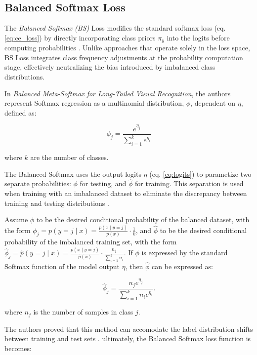 \subsection{Balanced Softmax Loss}
\label{sec:bs_loss}
The \emph{Balanced Softmax (BS)} Loss modifies the standard softmax loss (eq. \eqref{eq:ce_loss}) by directly incorporating class priors $\pi_y$ into the logits before computing probabilities \cite{ren2020balancedmetasoftmaxlongtailedvisual}. Unlike approaches that operate solely in the loss space, BS Loss integrates class frequency adjustments at the probability computation stage, effectively neutralizing the bias introduced by imbalanced class distributions. 

In \emph{Balanced Meta-Softmax for Long-Tailed Visual Recognition}, the authors represent Softmax regression as a multinomial distribution, $\phi$, dependent on $\eta$, defined as:

\begin{equation}
    \phi_j = \frac{e^{\eta_j}}{\sum_{i=1}^{k}e^{\eta_i}}
\end{equation}

where $k$ are the number of classes.

The Balanced Softmax uses the output logits $\eta$ (eq. \eqref{eq:logits}) to parametize two separate probabilities: $\phi$ for testing, and $\hat{\phi}$ for training. This separation is used when training with an imbalanced dataset to eliminate the discrepancy between training and testing distributions \cite{ren2020balancedmetasoftmaxlongtailedvisual}.

Assume $\phi$ to be the desired conditional probability of the balanced dataset, with the form $\phi_j = p(y = j \mid x) = \frac{p(x \mid y=j)}{p(x)} \cdot \frac{1}{k}$, and $\hat{\phi}$ to be the desired conditional probability of the imbalanced training set, with the form $\hat{\phi}_j = \hat{p}(y = j \mid x) = \frac{p(x \mid y=j)}{\hat{p}(x)} \cdot \frac{n_j}{\sum_{i=1}^{k} n_i}$. If $\phi$ is expressed by the standard Softmax function of the model output $\eta$, then $\hat{\phi}$ can be expressed as:

\begin{equation}
    \hat{\phi}_j = \frac{n_j e^{\eta_j}}{\sum_{i=1}^{k} n_i e^{\eta_i}}.
\end{equation}

where $n_j$ is the number of samples in class $j$.

The authors proved that this method can accomodate the label distribution shifts between training and test sets \cite{ren2020balancedmetasoftmaxlongtailedvisual}. ultimately, the Balanced Softmax loss function is becomes:


